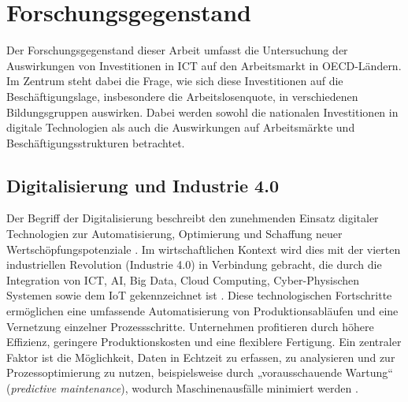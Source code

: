 
\section{Forschungsgegenstand}

Der Forschungsgegenstand dieser Arbeit umfasst die Untersuchung der Auswirkungen von 
Investitionen in \ac{ICT} auf den Arbeitsmarkt in \ac{OECD}-Ländern. Im Zentrum steht 
dabei die Frage, wie sich diese Investitionen auf die Beschäftigungslage, insbesondere 
die Arbeitslosenquote, in verschiedenen Bildungsgruppen auswirken. Dabei werden sowohl 
die nationalen Investitionen in digitale Technologien als auch die Auswirkungen auf 
Arbeitsmärkte und Beschäftigungsstrukturen betrachtet.


\subsection{Digitalisierung und Industrie 4.0}

Der Begriff der Digitalisierung beschreibt den zunehmenden Einsatz digitaler Technologien 
zur Automatisierung, Optimierung und Schaffung neuer Wertschöpfungspotenziale 
\parencite[vgl.][S. 6]{brennen2016theinternational}. Im wirtschaftlichen Kontext wird dies 
mit der vierten industriellen Revolution (Industrie 4.0) in Verbindung gebracht, die durch 
die Integration von \ac{ICT}, \ac{AI}, Big Data, Cloud Computing, Cyber-Physischen Systemen 
sowie dem \ac{IoT} gekennzeichnet ist \parencite[vgl.][S. 22]{kagermann2013recommendations}. 
Diese technologischen Fortschritte ermöglichen eine umfassende Automatisierung von 
Produktionsabläufen und eine Vernetzung einzelner Prozessschritte. Unternehmen profitieren 
durch höhere Effizienz, geringere Produktionskosten und eine flexiblere Fertigung. Ein 
zentraler Faktor ist die Möglichkeit, Daten in Echtzeit zu erfassen, zu analysieren und 
zur Prozessoptimierung zu nutzen, beispielsweise durch „vorausschauende Wartung“ 
(\textit{predictive maintenance}), wodurch Maschinenausfälle minimiert werden 
\parencite[vgl.][S. 85]{bartodziej2016theconcept}. 

